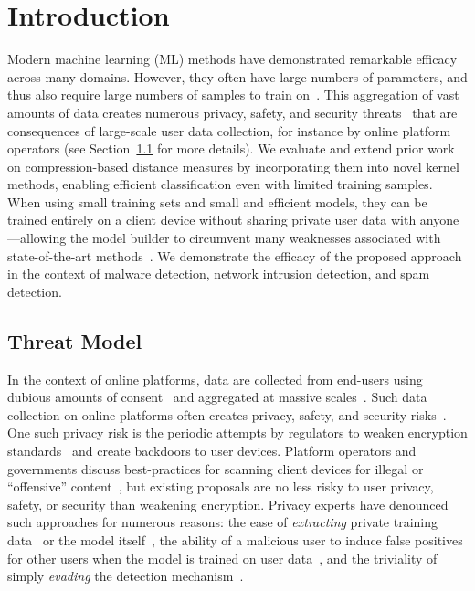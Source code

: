\documentclass[preprint,12pt]{article}
\begin{document}
\section{Introduction}

Modern machine learning (ML) methods have demonstrated remarkable efficacy across many domains.
However, they often have large numbers of parameters, and thus also require large numbers of samples to train on~\cite{desislavov2021compute}.
This aggregation of vast amounts of data creates numerous privacy, safety, and security threats~\cite{chat_control} that are consequences of large-scale user data collection, for instance by online platform operators (see Section~\ref{threat} for more details).
We evaluate and extend prior work on compression-based distance measures by incorporating them into novel kernel methods, enabling efficient classification even with limited training samples.
When using small training sets and small and efficient models, they can be trained entirely on a client device without sharing private user data with anyone---allowing the model builder to circumvent many weaknesses associated with state-of-the-art methods~\cite{chat_control,power_consumption_ai,desislavov2021compute}.
We demonstrate the efficacy of the proposed approach in the context of malware detection, network intrusion detection, and spam detection.

\subsection{Threat Model}
\label{threat}

In the context of online platforms, data are collected from end-users using dubious amounts of consent~\cite{nouwens2020dark} and aggregated at massive scales~\cite{desislavov2021compute}.
Such data collection on online platforms often creates privacy, safety, and security risks~\cite{chakraborty_adversarial_2018,meyers}.
One such privacy risk is the periodic attempts by regulators to weaken encryption standards~\cite{amnesty_encryption} and create backdoors to user devices.
Platform operators and governments discuss best-practices for scanning client devices for illegal or ``offensive''
content~\cite{chat_control,apple_csam}, but existing proposals are no less risky to user privacy, safety, or security than weakening encryption.
Privacy experts have denounced such approaches for numerous reasons: the ease of \textit{extracting} private training data~\cite{choquette2021label,fredrikson_model_2015,li2021membership} or the model itself~\cite{fredrikson_model_2015,orekondy2019knockoff,jagielski2020high,correia2018copycat,shokri2017membership}, the ability of a malicious user to induce false positives for other users when the model is trained on user data~\cite[\textit{poisoning} attacks;][]{rawat2022devil,shokri2020bypassing,gu2017badnets,saha2020hidden,aghakhani2021bullseye,turner2018clean,shafahi2018poison,geiping2020witches,souri2022sleeper}, and the triviality of simply \textit{evading} the detection mechanism~\cite{carlini_towards_2017,dohmatob_generalized_2019,hopskipjump,biggio_evasion_2013,meyers,chakraborty_adversarial_2018,deepfool,hopskipjump}.
\end{document}
